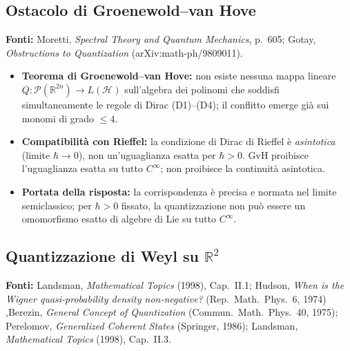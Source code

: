 \documentclass[12pt, a4paper]{article}
\newcommand{\fonti}[1]{%
	\begin{fontebox}
		\textcolor{fontecolor}{\footnotesize\textbf{Fonti:} #1}
	\end{fontebox}%
}
\begin{document}
	\subsection{Ostacolo di Groenewold--van Hove}
	
	\fonti{Moretti, \textit{Spectral Theory and Quantum Mechanics}, p.~605;
		Gotay, \textit{Obstructions to Quantization} (arXiv:math-ph/9809011).}
	
	\begin{itemize}
		\item \textbf{Teorema di Groenewold--van Hove:} non esiste nessuna mappa lineare
		$Q: \mathcal{P}(\mathbb{R}^{2n}) \to L(\mathcal{H})$ sull'algebra dei polinomi
		che soddisfi simultaneamente le regole di Dirac (D1)--(D4); il conflitto emerge
		già sui monomi di grado $\leq 4$.
		\item \textbf{Compatibilità con Rieffel:} la condizione di Dirac di Rieffel è
		\emph{asintotica} (limite $\hbar \to 0$), non un'uguaglianza esatta per $\hbar > 0$.
		GvH proibisce l'uguaglianza esatta su tutto $C^\infty$; non proibisce la continuità
		asintotica.
		\item \textbf{Portata della risposta:} la corrispondenza è precisa e normata nel
		limite semiclassico; per $\hbar > 0$ fissato, la quantizzazione non può essere un
		omomorfismo esatto di algebre di Lie su tutto $C^\infty$.
	\end{itemize}
	
	\subsection{Quantizzazione di Weyl su $\mathbb{R}^2$}
	
		\fonti{Landsman, \textit{Mathematical Topics} (1998), Cap.~II.1; Hudson, \textit{When is the Wigner quasi-probability density non-negative?} (Rep.\ Math.\ Phys.\ 6, 1974) ,Berezin, \textit{General Concept of Quantization} (Commun.\ Math.\ Phys.\ 40, 1975); Perelomov, \textit{Generalized Coherent States} (Springer, 1986); Landsman, \textit{Mathematical Topics} (1998), Cap.~II.3.}
	
\end{document}
